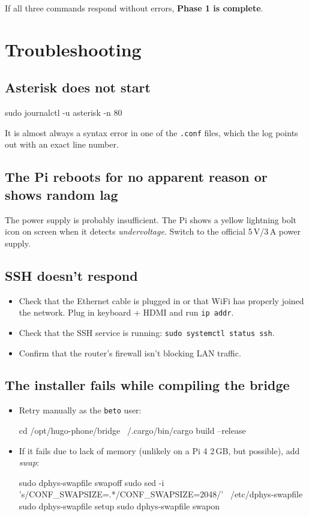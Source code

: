 If all three commands respond without errors, \textbf{Phase 1 is complete}.

\section{Troubleshooting}

\subsection{Asterisk does not start}

\begin{shellcode}
sudo journalctl -u asterisk -n 80
\end{shellcode}

It is almost always a syntax error in one of the \texttt{.conf} files, which the log points out with an exact line number.

\subsection{The Pi reboots for no apparent reason or shows random lag}

The power supply is probably insufficient. The Pi shows a yellow lightning bolt icon on screen when it detects \emph{undervoltage}. Switch to the official 5\,V/3\,A power supply.

\subsection{SSH doesn't respond}

\begin{itemize}
  \item Check that the Ethernet cable is plugged in or that WiFi has properly joined the network. Plug in keyboard + HDMI and run \texttt{ip addr}.
  \item Check that the SSH service is running: \texttt{sudo systemctl status ssh}.
  \item Confirm that the router's firewall isn't blocking LAN traffic.
\end{itemize}

\subsection{The installer fails while compiling the bridge}

\begin{itemize}
  \item Retry manually as the \texttt{beto} user:
  \begin{shellcode}
cd /opt/hugo-phone/bridge
~/.cargo/bin/cargo build --release
  \end{shellcode}
  \item If it fails due to lack of memory (unlikely on a Pi 4 2\,GB, but possible), add \emph{swap}:
  \begin{shellcode}
sudo dphys-swapfile swapoff
sudo sed -i 's/CONF_SWAPSIZE=.*/CONF_SWAPSIZE=2048/' \
  /etc/dphys-swapfile
sudo dphys-swapfile setup
sudo dphys-swapfile swapon
  \end{shellcode}
\end{itemize}
